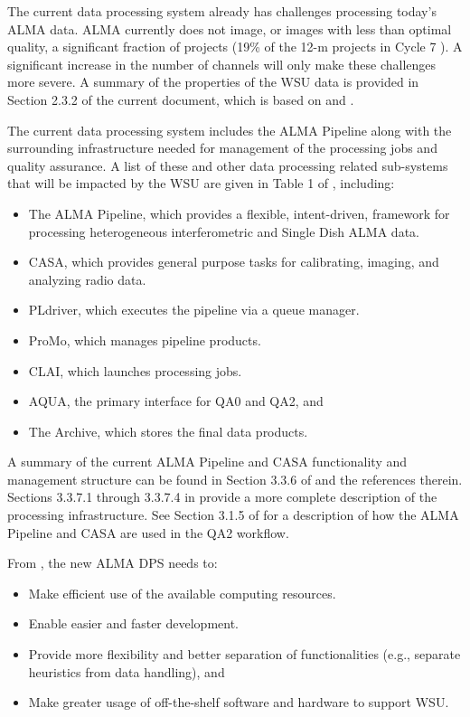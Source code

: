 The current data processing system already has challenges processing today’s ALMA data. ALMA currently does not image, or images with less than optimal quality, a significant fraction of projects (19\% of the 12-m projects in Cycle 7 \cite{memo623}). A significant increase in the number of channels will only make these challenges more severe. A summary of the properties of the WSU data is provided in Section 2.3.2 of the current document, which is based on \cite{drru_mean} and \cite{drru_peak}.

The current data processing system includes the ALMA Pipeline along with the surrounding infrastructure needed for management of the processing jobs and quality assurance. A list of these and other data processing related sub-systems that will be impacted by the WSU are given in Table 1 of \cite{dp}, including:

\begin{itemize}[itemsep=-0.5em]
    \item The ALMA Pipeline, which provides a flexible, intent-driven, framework for processing heterogeneous interferometric and Single Dish ALMA data.
    \item CASA, which provides general purpose tasks for calibrating, imaging, and analyzing radio data.
    \item PLdriver, which executes the pipeline via a queue manager.
    \item ProMo, which manages pipeline products.
    \item CLAI, which launches processing jobs.
    \item AQUA, the primary interface for QA0 and QA2, and 
    \item The Archive, which stores the final data products.
\end{itemize}

A summary of the current ALMA Pipeline and CASA functionality and management structure can be found in Section 3.3.6 of \cite{CSA-IA} and the references therein. Sections 3.3.7.1 through 3.3.7.4 in \cite{CSA-IA} provide a more complete description of the processing infrastructure. See Section 3.1.5 of \cite{CSA-IA} for a description of how the ALMA Pipeline and CASA are used in the QA2 workflow.

From \cite{dp, dpda}, the new ALMA DPS needs to:

\begin{itemize}[itemsep=-0.5em]
    \item Make efficient use of the available computing resources.
    \item Enable easier and faster development.
    \item Provide more flexibility and better separation of functionalities (e.g., separate heuristics from data handling), and  
    \item Make greater usage of off-the-shelf software and hardware to support WSU. 
\end{itemize}

